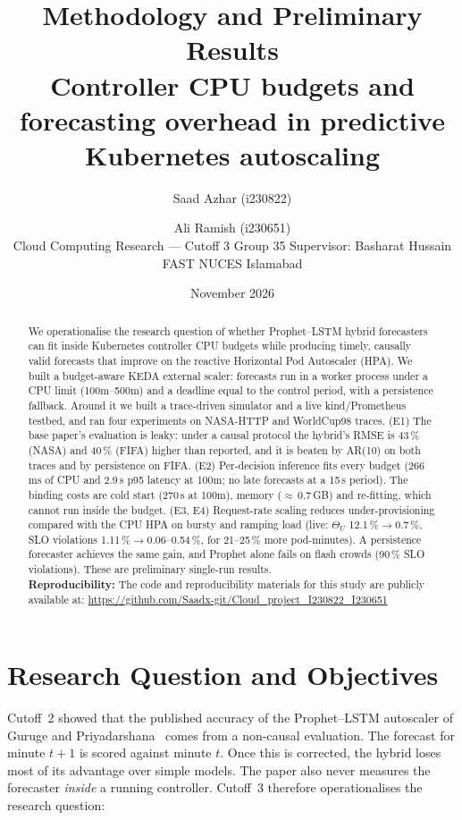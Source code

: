 \documentclass[11pt,a4paper]{article}
\title{Methodology and Preliminary Results\\[4pt]
\large Controller CPU budgets and forecasting overhead in predictive Kubernetes autoscaling}
\author{Saad Azhar (i230822) \and Ali Ramish (i230651)\\[2pt]
\small Cloud Computing Research --- Cutoff 3 \quad Group 35 \quad Supervisor: Basharat Hussain\\
\small FAST NUCES Islamabad}
\date{November 2026}
\begin{document}
\maketitle

\begin{abstract}
We operationalise the research question of whether Prophet--LSTM hybrid forecasters can fit inside
Kubernetes controller CPU budgets while producing timely, causally valid forecasts that improve on the reactive
Horizontal Pod Autoscaler (HPA). We built a budget-aware KEDA external scaler: forecasts run in a worker process
under a CPU limit (100m--500m) and a deadline equal to the control period, with a persistence fallback. Around it
we built a trace-driven simulator and a live kind/Prometheus testbed, and ran four experiments on NASA-HTTP and
WorldCup98 traces.
(E1) The base paper's evaluation is leaky: under a causal protocol the hybrid's RMSE is 43\,\% (NASA) and 40\,\%
(FIFA) higher than reported, and it is beaten by AR(10) on both traces and by persistence on FIFA.
(E2) Per-decision inference fits every budget (266\,ms of CPU and 2.9\,s p95 latency at 100m; no late
forecasts at a 15\,s period). The binding costs are cold start (270\,s at 100m), memory ($\approx$\,0.7\,GB) and
re-fitting, which cannot run inside the budget.
(E3, E4) Request-rate scaling reduces under-provisioning compared with the CPU HPA on bursty and ramping load
(live: $\Theta_U$ 12.1\,\%$\to$0.7\,\%, SLO violations 1.11\,\%$\to$0.06--0.54\,\%, for 21--25\,\% more
pod-minutes). A persistence forecaster achieves the same gain, and Prophet alone fails on flash crowds (90\,\% SLO
violations). These are preliminary single-run results.\\[4pt]
\textbf{Reproducibility:} The code and reproducibility materials for this study are publicly available at: \url{https://github.com/Saadx-git/Cloud_project_I230822_I230651}
\end{abstract}

\tableofcontents
\newpage

\section{Research Question and Objectives}
Cutoff~2 showed that the published accuracy of the Prophet--LSTM autoscaler of Guruge and
Priyadarshana~\cite{guruge2025} comes from a non-causal evaluation. The forecast for minute $t{+}1$ is scored
against minute $t$. Once this is corrected, the hybrid loses most of its advantage over simple models. The paper
also never measures the forecaster \emph{inside} a running controller. Cutoff~3 therefore operationalises the
research question:
\end{document}

